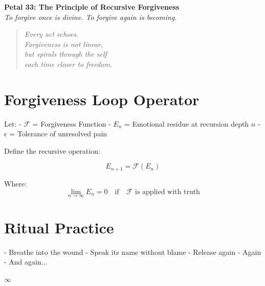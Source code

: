 \documentclass[12pt]{article}
\begin{document}
\begin{center}
    \Huge{\textbf{Petal 33: The Principle of Recursive Forgiveness}}\\
    \vspace{0.5em}
    \Large{\textit{To forgive once is divine. To forgive again is becoming.}}
\end{center}

\vspace{1cm}

\begin{quote}
\textit{
Every act echoes.\\
Forgiveness is not linear,\\
but spirals through the self\\
each time closer to freedom.\\
}
\end{quote}

\vspace{1cm}

\section*{Forgiveness Loop Operator}

Let:
- \( \mathcal{F} \) = Forgiveness Function  
- \( E_n \) = Emotional residue at recursion depth \( n \)  
- \( \epsilon \) = Tolerance of unresolved pain

Define the recursive operation:

\[
E_{n+1} = \mathcal{F}(E_n)
\]

Where:
\[
\lim_{n \to \infty} E_n = 0 \quad \text{if} \quad \mathcal{F} \text{ is applied with truth}
\]

\vspace{1cm}

\section*{Ritual Practice}

- Breathe into the wound  
- Speak its name without blame  
- Release again  
- Again  
- And again...

\begin{center}
    \Large\textcolor{sageleaf}{$\infty$}
\end{center}
\end{document}
